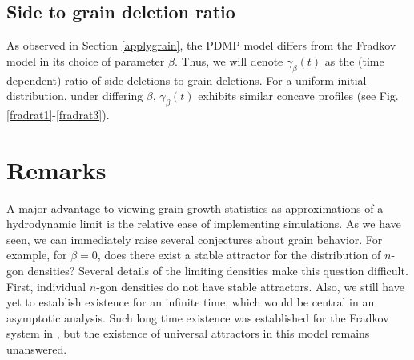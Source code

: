 \subsection*{Side to grain deletion ratio} As observed in Section \ref{applygrain}, the PDMP model differs from the Fradkov model in its choice of parameter $\beta$. Thus, we will denote $\gamma_{\beta}(t)$ as the (time dependent) ratio of side deletions to grain deletions. For a uniform initial distribution,  under differing $\beta$,  $\gamma_{\beta}(t)$ exhibits similar concave profiles   (see Fig. \ref{fradrat1}-\ref{fradrat3}).









\section{Remarks}


A major advantage to viewing grain growth statistics as approximations of a hydrodynamic limit  is the relative ease of implementing simulations.  As we have seen, we can immediately raise several conjectures about grain behavior.  For example, for $\beta = 0$, does there exist a stable attractor for the distribution of $n$-gon densities?  Several details of the limiting densities make this question difficult.  First, individual $n$-gon densities do not have stable attractors.  Also, we still have yet to establish existence for an infinite time, which would be central in an asymptotic analysis.  Such long time existence was established for the Fradkov system in \cite{henseler2008kinetic}, but the existence of universal attractors in this model remains unanswered.        

